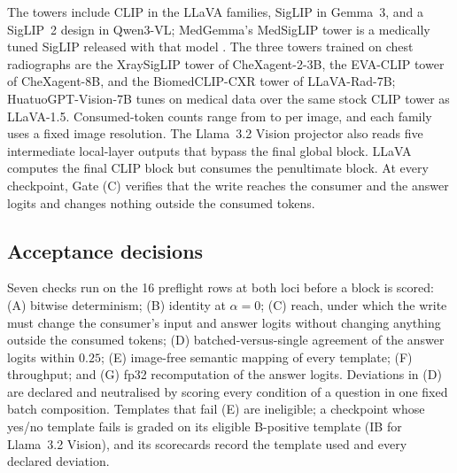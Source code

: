 \documentclass{article}
\begin{document}
The towers include CLIP \citep{radford2021clip} in the LLaVA families, SigLIP \citep{zhai2023siglip} in Gemma~3, and a SigLIP~2 design \citep{tschannen2025siglip2} in Qwen3-VL; MedGemma's MedSigLIP tower is a medically tuned SigLIP released with that model \citep{sellergren2025medgemma}. The three towers trained on chest radiographs are the XraySigLIP tower of CheXagent-2-3B, the EVA-CLIP tower of CheXagent-8B, and the BiomedCLIP-CXR tower of LLaVA-Rad-7B; HuatuoGPT-Vision-7B tunes on medical data over the same stock CLIP tower as LLaVA-1.5. Consumed-token counts range from \cfTokensMin{} to \cfTokensMax{} per image, and each family uses a fixed image resolution. The Llama~3.2 Vision projector also reads five intermediate local-layer outputs that bypass the final global block. LLaVA computes the final CLIP block but consumes the penultimate block. At every checkpoint, Gate (C) verifies that the write reaches the consumer and the answer logits and changes nothing outside the consumed tokens.

\subsection{Acceptance decisions}
\label{app:cf-gates}

Seven checks run on the 16 preflight rows at both loci before a block is scored: (A) bitwise determinism; (B) identity at $\alpha=0$; (C) reach, under which the write must change the consumer's input and answer logits without changing anything outside the consumed tokens; (D) batched-versus-single agreement of the answer logits within $0.25$; (E) image-free semantic mapping of every template; (F) throughput; and (G) fp32 recomputation of the answer logits. Deviations in (D) are declared and neutralised by scoring every condition of a question in one fixed batch composition. Templates that fail (E) are ineligible; a checkpoint whose yes/no template fails is graded on its eligible B-positive template (IB for Llama~3.2 Vision), and its scorecards record the template used and every declared deviation.
\end{document}
